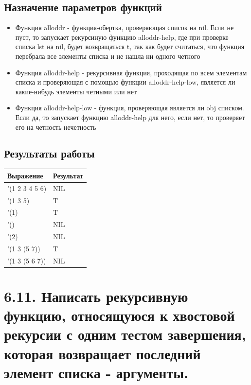 \documentclass[a4paper,12pt]{article}
\begin{document}
 	\subsection*{Назначение параметров функций}
 	
 	\begin{itemize}
 		\item Функция alloddr - функция-обертка, проверяющая список на nil. Если не пуст, то запускает рекурсиную функцию alloddr-help, где при проверке списка lst на nil, будет возвращаться t, так как будет считаться, что функция перебрала все элементы списка и не нашла ни одного четного
 		\item Функция alloddr-help - рекурсивная функция, проходящая по всем элементам списка и проверяющая с помощью функции alloddr-help-low, является ли какие-нибудь элементы четными или нет
 		\item Функция alloddr-help-low - функция, проверяющая является ли obj списком. Если да, то запускает функцию alloddr-help для него, если нет, то проверяет его на четность нечетность
 	\end{itemize}
 	
 	\subsection*{Результаты работы}
 	
 	 	 	\begin{table} [h!]
 		\begin{center}
 			\begin{tabular}{|l|l|}
 				\hline
 				{\bf  Выражение} & {\bf Результат} \\
 				\hline
 				{'(1 2 3 4 5 6)} & NIL\\
 				\hline
 				{'(1 3 5)} & T\\
 				\hline
 				{'(1)} & T\\
 				\hline
 				{'()} & NIL\\
 				\hline
 				{'(2)} & NIL\\
 				\hline
 				{'(1 3 (5 7))} & T\\
 				\hline
 				{'(1 3 (5 6 7))} & NIL\\
 				\hline
 			\end{tabular}  
 			\label{m2}
 		\end{center}
 	\end{table}
 
 	\newpage
 	
 	\section*{6.11. Написать рекурсивную функцию, относящуюся к хвостовой рекурсии с одним тестом завершения, которая возвращает последний элемент списка - аргументы.
 	}
 	
\end{document}
